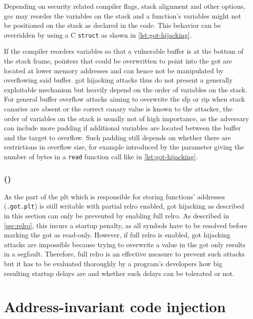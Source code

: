 Depending on security related compiler flags, stack alignment and other options, \gls{gcc} may reorder the variables on the stack and a function's variables might not be positioned on the stack as declared in the code.
This behavior can be overridden by using a C \texttt{struct} as shown in \cref{lst:got-hijacking}.

If the compiler reorders variables so that a vulnerable buffer is at the bottom of the stack frame, pointers that could be overwritten to point into the \gls{got} are located at lower memory addresses and can hence not be manipulated by overflowing said buffer.
\gls{got} hijacking attacks thus do not present a generally exploitable mechanism but heavily depend on the order of variables on the stack.
For general buffer overflow attacks aiming to overwrite the \gls{sfp} or \gls{rip} when stack canaries are absent or the correct canary value is known to the attacker, the order of variables on the stack is usually not of high importance, as the adversary can include more padding if additional variables are located between the buffer and the target to overflow.
Such padding still depends on whether there are restrictions in overflow size, for example introduced by the parameter giving the number of bytes in a \texttt{read} function call like in \cref{lst:got-hijacking}.

\subsubsection{ ()}
\label{subsubsec:got-relro}

As the part of the \gls{plt} which is responsible for storing functions' addresses (\texttt{.got.plt}) is still writable with partial \gls{relro} enabled, \gls{got} hijacking as described in this section can only be prevented by enabling full \gls{relro}.
As described in \cref{sec:relro}, this incurs a startup penalty, as all symbols have to be resolved before marking the \gls{got} as read-only.
However, if full \gls{relro} is enabled, \gls{got} hijacking attacks are impossible because trying to overwrite a value in the \gls{got} only results in a \gls{segfault}.
Therefore, full \gls{relro} is an effective measure to prevent such attacks but it has to be evaluated thoroughly by a program's developers how big resulting startup delays are and whether such delays can be tolerated or not.

\section{Address-invariant code injection}
\label{sec:address-invariant-code-injection}


